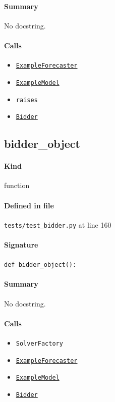 \documentclass[11pt]{report}
\begin{document}
\paragraph{Summary} No docstring.
\paragraph{Calls}
\begin{itemize}[leftmargin=*]
  \item \hyperref[def:tests-util.py:ExampleForecaster:L259]{\texttt{ExampleForecaster}}
  \item \hyperref[def:tests-util.py:ExampleModel:L25]{\texttt{ExampleModel}}
  \item \texttt{raises}
  \item \hyperref[def:bidder.py:Bidder:L1000]{\texttt{Bidder}}
\end{itemize}
\subsection{bidder\_object}
\label{def:tests-test_bidder.py:bidder_object:L160}
\paragraph{Kind} function
\paragraph{Defined in file} \texttt{tests/test\_bidder.py} at line 160
\paragraph{Signature} \texttt{def bidder\_object():}
\paragraph{Summary} No docstring.
\paragraph{Calls}
\begin{itemize}[leftmargin=*]
  \item \texttt{SolverFactory}
  \item \hyperref[def:tests-util.py:ExampleForecaster:L259]{\texttt{ExampleForecaster}}
  \item \hyperref[def:tests-util.py:ExampleModel:L25]{\texttt{ExampleModel}}
  \item \hyperref[def:bidder.py:Bidder:L1000]{\texttt{Bidder}}
\end{itemize}
\end{document}
